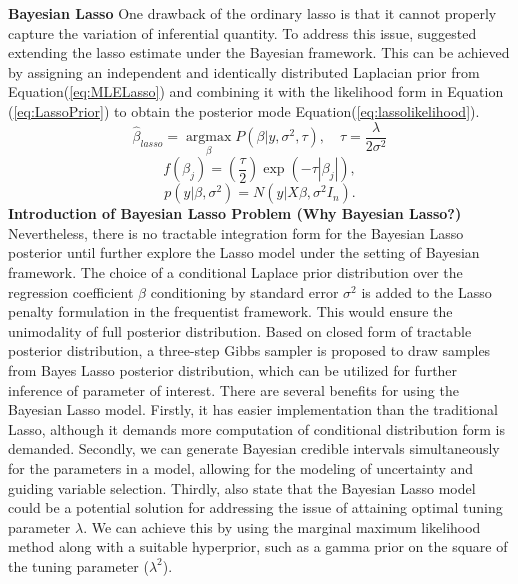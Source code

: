 \textbf{Bayesian Lasso}
One drawback of the ordinary lasso is that it cannot properly capture the variation of inferential quantity. To address this issue, \cite{tibshirani_1996} suggested extending the lasso estimate under the Bayesian framework. This can be achieved by assigning an independent and identically distributed Laplacian prior from Equation(\ref{eq:MLELasso}) and combining it with the likelihood form in Equation (\ref{eq:LassoPrior}) to obtain the posterior mode Equation(\ref{eq:lassolikelihood}). 
\begin{equation}
	\label{eq:MLELasso}
	\hat{\beta}_{lasso} = \underset{\beta}{\operatorname{argmax}}P(\beta|y,\sigma^2,\tau), \quad \tau = \frac{\lambda}{2\sigma^2}
\end{equation}
\begin{equation}
	\label{eq:LassoPrior}
	f(\beta_j) = (\frac{\tau}{2}) \exp(-\tau|\beta_j|),
\end{equation}
\begin{equation}
	\label{eq:lassolikelihood}
	p(y |\beta,\sigma^2) = N(y|X\beta,\sigma^2I_n).
\end{equation}
\textbf{Introduction of Bayesian Lasso Problem (Why Bayesian Lasso?)}
Nevertheless, there is no tractable integration form for the Bayesian Lasso posterior until \cite{park_casella_2008} further explore the Lasso model under the setting of Bayesian framework. The choice of a conditional Laplace prior distribution over the regression coefficient $\beta$ conditioning by standard error $\sigma^2$ is added to the Lasso penalty formulation in the frequentist framework. This would ensure the unimodality of full posterior distribution. Based on closed form of tractable posterior distribution, a three-step Gibbs sampler is proposed to draw samples from Bayes Lasso posterior distribution, which can be utilized for further inference of parameter of interest.
There are several benefits for using the Bayesian Lasso model. Firstly, it has easier implementation than the traditional Lasso, although it demands more computation of conditional distribution form is demanded. Secondly, we can generate Bayesian credible intervals simultaneously for the parameters in a model, allowing for the modeling of uncertainty and guiding variable selection.
Thirdly, \cite{park_casella_2008} also state that the Bayesian Lasso model could be a potential solution for addressing the issue of attaining optimal tuning parameter $\lambda$. We can achieve this by using the marginal maximum likelihood method along with a suitable hyperprior, such as a gamma prior on the square of the tuning parameter ($\lambda^2$).
